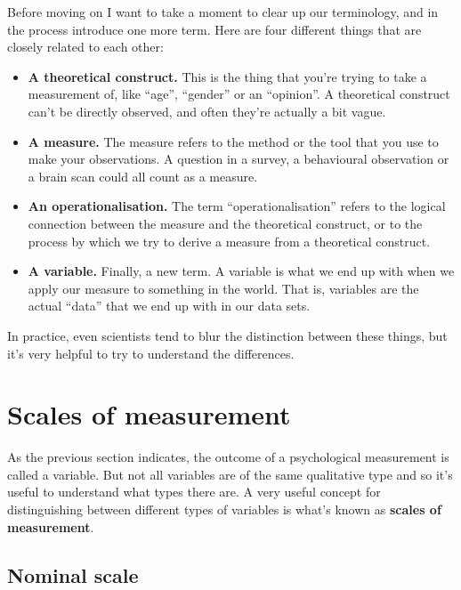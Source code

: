 \documentclass[
  a4paper,
]{book}
\providecommand{\tightlist}{%
  \setlength{\itemsep}{0pt}\setlength{\parskip}{0pt}}\usepackage{longtable,booktabs,array}
\begin{document}
Before moving on I want to take a moment to clear up our terminology,
and in the process introduce one more term. Here are four different
things that are closely related to each other:

\begin{itemize}
\tightlist
\item
  \textbf{A theoretical construct.} This is the thing that you're trying
  to take a measurement of, like ``age'', ``gender'' or an ``opinion''.
  A theoretical construct can't be directly observed, and often they're
  actually a bit vague.
\item
  \textbf{A measure.} The measure refers to the method or the tool that
  you use to make your observations. A question in a survey, a
  behavioural observation or a brain scan could all count as a measure.
\item
  \textbf{An operationalisation.} The term ``operationalisation'' refers
  to the logical connection between the measure and the theoretical
  construct, or to the process by which we try to derive a measure from
  a theoretical construct.
\item
  \textbf{A variable.} Finally, a new term. A variable is what we end up
  with when we apply our measure to something in the world. That is,
  variables are the actual ``data'' that we end up with in our data
  sets.
\end{itemize}

In practice, even scientists tend to blur the distinction between these
things, but it's very helpful to try to understand the differences.

\hypertarget{sec-Scales-of-measurement}{%
\section{Scales of measurement}\label{sec-Scales-of-measurement}}

As the previous section indicates, the outcome of a psychological
measurement is called a variable. But not all variables are of the same
qualitative type and so it's useful to understand what types there are.
A very useful concept for distinguishing between different types of
variables is what's known as \textbf{scales of measurement}.

\hypertarget{nominal-scale}{%
\subsection{Nominal scale}\label{nominal-scale}}
\end{document}
